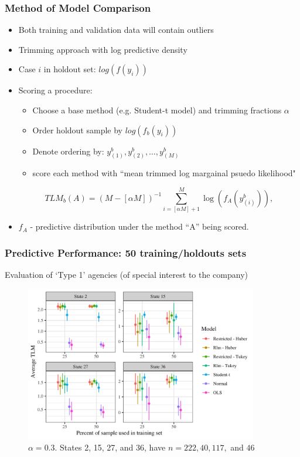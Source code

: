 \documentclass{beamer}
\begin{document}
\begin{frame}
	\frametitle{Method of Model Comparison}
\begin{itemize}
	\item Both training and validation data will contain outliers
	\item Trimming approach with log predictive density \citep{jung2014}
	\item Case $i$ in holdout set: $log(f(y_i))$
	\item Scoring a procedure:
	\begin{itemize}
		\item Choose a base method (e.g. Student-t model) and trimming fractions $\alpha$
		\item Order holdout sample by $log(f_b(y_i))$
		\item Denote ordering by: $y_{(1)}^b, y_{(2)}^b, \dots, y_{(M)}^b$
		\item score each method with ``mean trimmed log margainal psuedo likelihood"
	\end{itemize}
\[TLM_b(A) = (M - [\alpha M])^{-1} \sum_{i=[\alpha M]+1}^{M}
\log(f_A(y_{(i)}^b)),\]
\end{itemize}
\begin{itemize}
	\item $f_A$ - predictive distribution under the method ``A'' being scored. 
\end{itemize}
\end{frame}


\begin{frame}
	\frametitle{Predictive Performance: 50 training/holdouts sets}
Evaluation of `Type 1' agencies (of special interest to the company)
\begin{figure}[t]
	\centering
	\includegraphics[width=4in]{tlm_base_Student-t.png}
	\caption{$\alpha = 0.3$. States 2, 15, 27, and 36, have $n = 222, 40, 117,$ and $46$}
	\label{fig:tlm}
\end{figure}
\end{frame}
\end{document}

